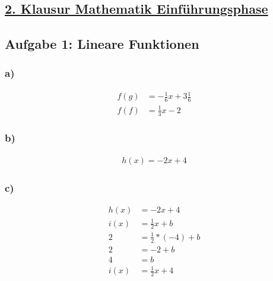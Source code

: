 \documentclass[a4paper, 10pt]{scrartcl}
\begin{document}
\sffamily
{}
\setcounter{page}{1}

\begin{center}
	\section*{\underline{\textbf {2. Klausur Mathematik Einführungsphase}}}
\end{center}
\vspace*{5mm}

\subsection*{\textbf{Aufgabe 1: Lineare Funktionen}}
	\begin{minipage}{0.5\textwidth}
		\subsubsection*{a)}
			\begin{align*}
				f(g)&=-\frac{1}{6}x+3\frac{1}{6} \\
				f(f)&=\frac{1}{3}x-2
			\end{align*}
		\subsubsection*{b)}
			\begin{align*}
				h(x)=-2x+4
			\end{align*}
	\end {minipage}
	\begin {minipage}{0.5\textwidth}
		\subsubsection*{c)}
			\begin{align*}
				h(x) &= -2x + 4 \\
				i(x) &= \frac{1}{2}x + b\\
				2	 &= \frac{1}{2}	* (-4) + b\\
				2	 &= -2 + b \\
				4	 &= b\\
				i(x) &= \frac{1}{2}x + 4
			\end{align*}
	\end{minipage}
\vspace*{5mm}
\end{document}
